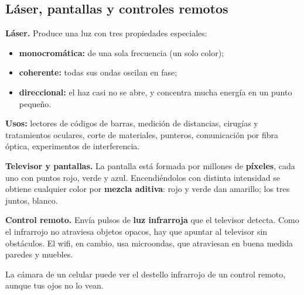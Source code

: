 \subsection{Láser, pantallas y controles remotos}
\textbf{Láser.} Produce una luz con tres propiedades especiales:

 
\begin{itemize}
  \item \textbf{monocromática:} de una sola frecuencia (un solo color);
  \item \textbf{coherente:} todas sus ondas oscilan en fase;
  \item \textbf{direccional:} el haz casi no se abre, y concentra mucha energía en un punto pequeño.
\end{itemize}
 

\textbf{Usos:} lectores de códigos de barras, medición de distancias, cirugías y tratamientos oculares, corte de materiales, punteros, comunicación por fibra óptica, experimentos de interferencia.

  

\textbf{Televisor y pantallas.} La pantalla está formada por millones de \textbf{píxeles}, cada uno con puntos rojo, verde y azul. Encendiéndolos con distinta intensidad se obtiene cualquier color por \textbf{mezcla aditiva}: rojo y verde dan amarillo; los tres juntos, blanco.

 

\textbf{Control remoto.} Envía pulsos de \textbf{luz infrarroja} que el televisor detecta. Como el infrarrojo no atraviesa objetos opacos, hay que apuntar al televisor sin obstáculos. El wifi, en cambio, usa microondas, que atraviesan en buena medida paredes y muebles.

 
\begin{clave}[{Recuerda}] La cámara de un celular puede ver el destello infrarrojo de un control remoto, aunque tus ojos no lo vean.\end{clave}
